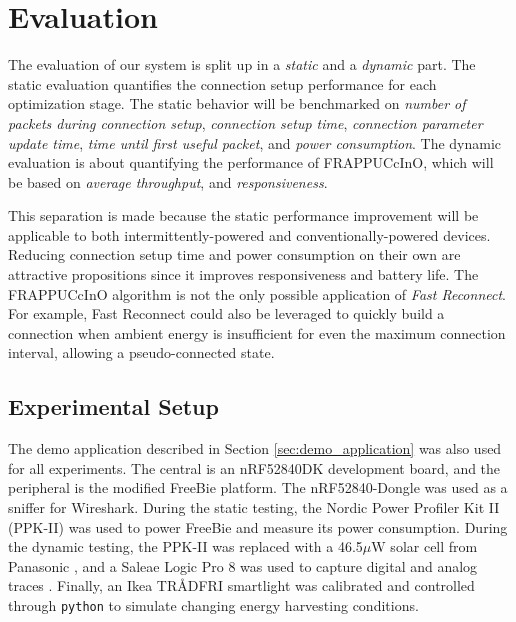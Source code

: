 \chapter{Evaluation}
\label{chp:chapter_4}
The evaluation of our system is split up in a \textit{static} and a \textit{dynamic} part. The static evaluation quantifies the connection setup performance for each optimization stage. The static behavior will be benchmarked on \textit{number of packets during connection setup}, \textit{connection setup time}, \textit{connection parameter update time}, \textit{time until first useful packet}, and \textit{power consumption}. The dynamic evaluation is about quantifying the performance of FRAPPUCcInO, which will be based on \textit{average throughput}, and \textit{responsiveness}.

This separation is made because the static performance improvement will be applicable to both intermittently-powered and conventionally-powered devices. Reducing connection setup time and power consumption on their own are attractive propositions since it improves responsiveness and battery life. The FRAPPUCcInO algorithm is not the only possible application of \textit{Fast Reconnect}. For example, Fast Reconnect could also be leveraged to quickly build a connection when ambient energy is insufficient for even the maximum connection interval, allowing a pseudo-connected state. 

\section{Experimental Setup}
\label{sec:evaluation_setup}
The demo application described in Section \ref{sec:demo_application} was also used for all experiments. The central is an nRF52840DK development board, and the peripheral is the modified FreeBie platform. The nRF52840-Dongle was used as a sniffer for Wireshark. During the static testing, the Nordic Power Profiler Kit II (PPK-II) was used to power FreeBie and measure its power consumption. During the dynamic testing, the PPK-II was replaced with a 46.5$\mu\text{W}$ solar cell from Panasonic \cite{panasonic_solar}, and a Saleae Logic Pro 8 was used to capture digital and analog traces \cite{saleae_logic_pro_8}. Finally, an Ikea TRÅDFRI smartlight was calibrated and controlled through \texttt{python} to simulate changing energy harvesting conditions. 

